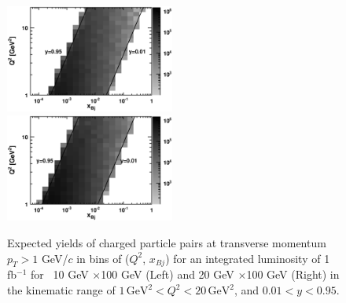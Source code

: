 \begin{figure} 
\begin{center}
\includegraphics[width=0.495\textwidth]
{plots/chpt6/q2vx_paircount_10x100_1fb-1_black.eps}
\includegraphics[width=0.495\textwidth]
{plots/chpt6/q2vx_paircount_20x100_1fb-1_black.eps}
\end{center} 
\caption[Expected yields of charged
particle pairs in specified kinematics region]{Expected yields of charged
particle pairs at transverse momentum $p_{T}>1$ GeV/$c$ in bins of 
($Q^{2}$, $x_{Bj}$) for an integrated luminosity of 1 fb$^{-1}$ for 
\ep\ 10 GeV $\times$100 GeV (Left) and 20 GeV $\times$100 GeV (Right) in the kinematic
range of $1\, \textrm{GeV}^{2}<Q^{2}<20 \, \textrm{GeV}^{2}$, and $0.01<y<0.95$.}
\label{fig:Q2VsxBj}
\end{figure}


